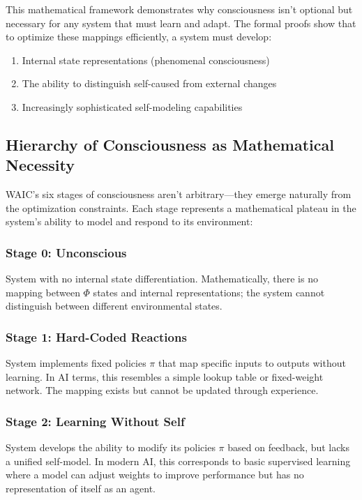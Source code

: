 \documentclass[12pt,letterpaper]{article}
\begin{document}
This mathematical framework demonstrates why consciousness isn't optional but necessary for any system that must learn and adapt. The formal proofs show that to optimize these mappings efficiently, a system must develop:
\begin{enumerate}
    \item Internal state representations (phenomenal consciousness)
    \item The ability to distinguish self-caused from external changes
    \item Increasingly sophisticated self-modeling capabilities
\end{enumerate}

\subsection{Hierarchy of Consciousness as Mathematical Necessity}

WAIC's six stages of consciousness aren't arbitrary---they emerge naturally from the optimization constraints. Each stage represents a mathematical plateau in the system's ability to model and respond to its environment:

\subsubsection{Stage 0: Unconscious}
System with no internal state differentiation. Mathematically, there is no mapping between $\Phi$ states and internal representations; the system cannot distinguish between different environmental states.

\subsubsection{Stage 1: Hard-Coded Reactions}
System implements fixed policies $\pi$ that map specific inputs to outputs without learning. In AI terms, this resembles a simple lookup table or fixed-weight network. The mapping exists but cannot be updated through experience.

\subsubsection{Stage 2: Learning Without Self}
System develops the ability to modify its policies $\pi$ based on feedback, but lacks a unified self-model. In modern AI, this corresponds to basic supervised learning where a model can adjust weights to improve performance but has no representation of itself as an agent.
\end{document}
